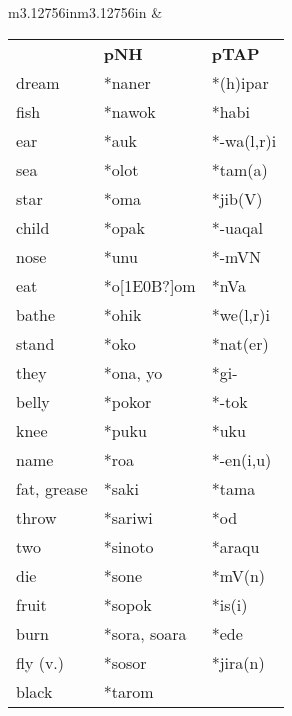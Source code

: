 \begin{center}
\begin{supertabular}{m{3.12756in}m{3.12756in}}
 &
\begin{flushleft}
\begin{tabular}{m{0.69835985in}m{-0.0134401545in}m{0.76435983in}m{-0.031540155in}m{0.7170598in}}
\multicolumn{2}{m{0.76365983in}}{} &
\textbf{pNH} &
\multicolumn{2}{m{0.7642598in}}{\textbf{pTAP}}\\
dream &
\multicolumn{3}{m{0.87685984in}}{*naner{\ddag}} &
*(h)ipar\\
fish &
\multicolumn{3}{m{0.87685984in}}{*nawok} &
*habi\\
ear &
\multicolumn{3}{m{0.87685984in}}{*{\ng}auk} &
*-wa(l,r)i\\
sea &
\multicolumn{3}{m{0.87685984in}}{*{\ng}olot} &
*tam(a)\\
star &
\multicolumn{3}{m{0.87685984in}}{*{\ng}oma} &
*jib(V)\\
child &
\multicolumn{3}{m{0.87685984in}}{*{\ng}opak} &
*-uaqal\footnotemark{}\\
nose &
\multicolumn{3}{m{0.87685984in}}{*{\ng}unu{\ng}} &
*-mVN\\
eat &
\multicolumn{3}{m{0.87685984in}}{*o[1E0B?]om} &
*nVa\\
bathe &
\multicolumn{3}{m{0.87685984in}}{*ohik{\ddag}} &
*we(l,r)i\\
stand &
\multicolumn{3}{m{0.87685984in}}{*oko} &
*nat(er)\\
they &
\multicolumn{3}{m{0.87685984in}}{*ona, yo} &
*gi- {\ddag}\\
belly &
\multicolumn{3}{m{0.87685984in}}{*pokor} &
*-tok {\ddag}\\
knee &
\multicolumn{3}{m{0.87685984in}}{*puku} &
*uku {\ddag}\\
name &
\multicolumn{3}{m{0.87685984in}}{*ro{\ng}a} &
*-en(i,u) {\ddag}\\
fat, grease &
\multicolumn{3}{m{0.87685984in}}{*saki} &
*tama {\ddag}\\
throw &
\multicolumn{3}{m{0.87685984in}}{*sariwi} &
*od {\ddag}\\
two &
\multicolumn{3}{m{0.87685984in}}{*sinoto} &
*araqu {\ddag}\\
die  &
\multicolumn{3}{m{0.87685984in}}{*sone{\ng}} &
*mV(n)\\
fruit &
\multicolumn{3}{m{0.87685984in}}{*sopok} &
*is(i) {\ddag}\\
burn &
\multicolumn{3}{m{0.87685984in}}{*sora, so{\ng}ara} &
*ede {\ddag}\\
fly (v.) &
\multicolumn{3}{m{0.87685984in}}{*sosor} &
*jira(n) {\ddag}\\
black &
\multicolumn{3}{m{0.87685984in}}{*tarom} &

\end{tabular}
\end{flushleft}
\end{supertabular}
\end{center}
